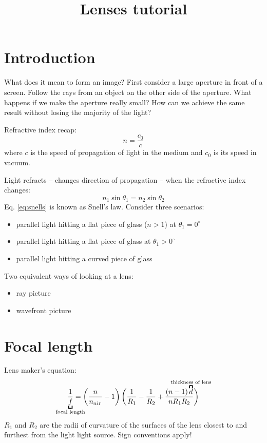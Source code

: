 \documentclass{article}
\begin{document}
\title{\vspace{-2.0cm}Lenses tutorial}

\maketitle

\addtocounter{exercises}{1}

\section{Introduction}
What does it mean to form an image? First consider a large aperture in front of a screen. Follow the rays from an object on the other side of the aperture. What happens if we make the aperture really small? How can we achieve the same result without losing the majority of the light?

Refractive index recap:
\begin{equation}
n = \frac{c_0}{c}
\end{equation}
where $c$ is the speed of propagation of light in the medium and $c_0$ is its speed in vacuum.

Light refracts -- changes direction of propagation -- when the refractive index changes:
\begin{equation}
\label{eq:snells}
	n_1 \sin{\theta_1} = n_2 \sin{\theta_2}
\end{equation} 
Eq. \ref{eq:snells} is known as Snell's law. Consider three scenarios:
\begin{itemize}
	\item parallel light hitting a flat piece of glass ($n>1$) at $\theta_1=0^\circ$
	\item parallel light hitting a flat piece of glass at $\theta_1>0^\circ$
	\item parallel light hitting a curved piece of glass
\end{itemize}
Two equivalent ways of looking at a lens:
\begin{itemize}
	\item ray picture
	\item wavefront picture
\end{itemize}
\section{Focal length}
Lens maker's equation:
\begin{equation}
\label{eq:lensmaker}
	\frac{1}{\underbracket{f}_{\mathclap{\text{focal length}}}}=\left(\frac{n}{n_{air}}-1\right)
	\bigg(\frac{1}{R_1} -
	\frac{1}{R_2}+\frac{(n-1)\overbracket{d}^{\mathclap{\text{thickness of lens}}}}{nR_1R_2}\bigg)
\end{equation}
$R_1$ and $R_2$ are the radii of curvature of the surfaces of the lens closest to and furthest from the light light source. Sign conventions apply! 
\end{document}
